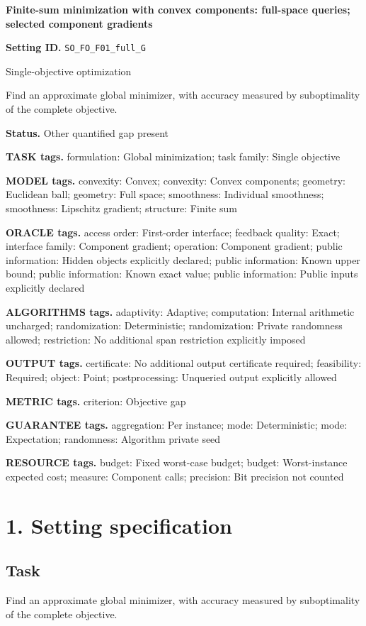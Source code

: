 \documentclass[10pt,a4paper]{article}
\begin{document}
\raggedright

{\LARGE\bfseries\sffamily\color{AtlasNavy} Finite-sum minimization with convex components: full-space queries; selected component gradients\par}\vspace{5pt}
\textbf{Setting ID.} \texttt{SO\_\allowbreak{}FO\_\allowbreak{}F01\_\allowbreak{}full\_\allowbreak{}G}

Single-objective optimization

Find an approximate global minimizer, with accuracy measured by suboptimality of the complete objective.

\textbf{Status.} Other quantified gap present

\textbf{TASK tags.} formulation: Global minimization; task family: Single objective

\textbf{MODEL tags.} convexity: Convex; convexity: Convex components; geometry: Euclidean ball; geometry: Full space; smoothness: Individual smoothness; smoothness: Lipschitz gradient; structure: Finite sum

\textbf{ORACLE tags.} access order: First-order interface; feedback quality: Exact; interface family: Component gradient; operation: Component gradient; public information: Hidden objects explicitly declared; public information: Known upper bound; public information: Known exact value; public information: Public inputs explicitly declared

\textbf{ALGORITHMS tags.} adaptivity: Adaptive; computation: Internal arithmetic uncharged; randomization: Deterministic; randomization: Private randomness allowed; restriction: No additional span restriction explicitly imposed

\textbf{OUTPUT tags.} certificate: No additional output certificate required; feasibility: Required; object: Point; postprocessing: Unqueried output explicitly allowed

\textbf{METRIC tags.} criterion: Objective gap

\textbf{GUARANTEE tags.} aggregation: Per instance; mode: Deterministic; mode: Expectation; randomness: Algorithm private seed

\textbf{RESOURCE tags.} budget: Fixed worst-case budget; budget: Worst-instance expected cost; measure: Component calls; precision: Bit precision not counted

\section{1. Setting specification}
\subsection{Task}
Find an approximate global minimizer, with accuracy measured by suboptimality of the complete objective.
\end{document}
